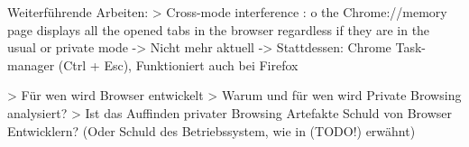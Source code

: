 Weiterführende Arbeiten:
> Cross-mode interference \cite{Hedberg.2013}:
	o	the Chrome://memory page displays all the opened tabs in the browser regardless if they are in the usual or private mode -> Nicht mehr aktuell -> Stattdessen: Chrome Task-manager (Ctrl + Esc), Funktioniert auch bei Firefox



> Für wen wird Browser entwickelt
> Warum und für wen wird Private Browsing analysiert?
> Ist das Auffinden privater Browsing Artefakte Schuld von Browser Entwicklern? (Oder Schuld des Betriebssystem, wie in (TODO!) erwähnt)

